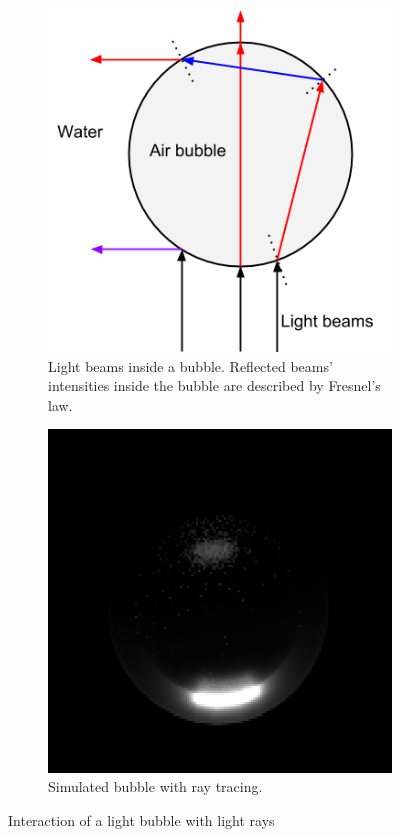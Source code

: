 			\begin{figure}
		    \centering
		    \begin{subfigure}[t]{0.5\textwidth}
		    		\centering
		        \includegraphics[scale=.5]{images/bubble_refraction.png}
		        \caption{Light beams inside a bubble. Reflected beams' intensities inside the bubble are described by Fresnel's law.}
		        \label{subfig:bubble_refraction}
		    \end{subfigure}%
		    \begin{subfigure}[t]{0.5\textwidth}
		    		\centering
		        \includegraphics[scale=0.6]{images/bubble_simulation.png}
		        \caption{Simulated bubble with ray tracing.}	
		        \label{subfig:bubble_simulation}
		    \end{subfigure}
		    
		    \caption{Interaction of a light bubble with light rays}
		    \label{fig:bubble_physics}
	 		\end{figure}	
			
